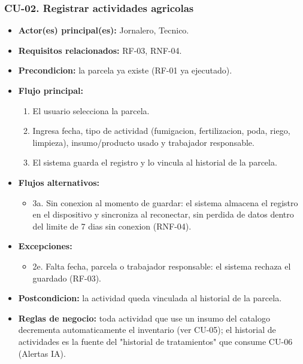 \documentclass[11pt,a4paper]{article}
\begin{document}
\subsubsection{CU-02. Registrar actividades agricolas}
\begin{itemize}
\item \textbf{Actor(es) principal(es):} Jornalero, Tecnico.
\item \textbf{Requisitos relacionados:} RF-03, RNF-04.
\item \textbf{Precondicion:} la parcela ya existe (RF-01 ya ejecutado).
\item \textbf{Flujo principal:}
  \begin{enumerate}
  \item El usuario selecciona la parcela.
  \item Ingresa fecha, tipo de actividad (fumigacion, fertilizacion, poda, riego, limpieza), insumo/producto usado y trabajador responsable.
  \item El sistema guarda el registro y lo vincula al historial de la parcela.
  \end{enumerate}
\item \textbf{Flujos alternativos:}
  \begin{itemize}
  \item 3a. Sin conexion al momento de guardar: el sistema almacena el registro en el dispositivo y sincroniza al reconectar, sin perdida de datos dentro del limite de 7 dias sin conexion (RNF-04).
  \end{itemize}
\item \textbf{Excepciones:}
  \begin{itemize}
  \item 2e. Falta fecha, parcela o trabajador responsable: el sistema rechaza el guardado (RF-03).
  \end{itemize}
\item \textbf{Postcondicion:} la actividad queda vinculada al historial de la parcela.
\item \textbf{Reglas de negocio:} toda actividad que use un insumo del catalogo decrementa automaticamente el inventario (ver CU-05); el historial de actividades es la fuente del "historial de tratamientos" que consume CU-06 (Alertas IA).
\end{itemize}
\end{document}
